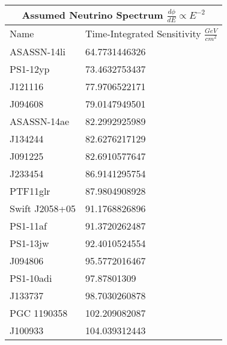 \documentclass[]{article}
\begin{document}
\begin{tabular}{ |p{5cm}||p{5cm}|} 
\hline 
\multicolumn{2}{|c|}{Assumed Neutrino Spectrum $ \frac {d \phi}{dE} \propto E ^ {-2} $} \\ 
\hline 
Name&Time-Integrated Sensitivity $ \frac{GeV}{cm^{2}}$ \\ 
\hline 
ASASSN-14li & \num[round-precision=2, round-mode=figures, scientific-notation=true]{64.7731446326}  \\ 
PS1-12yp & \num[round-precision=2, round-mode=figures, scientific-notation=true]{73.4632753437}  \\ 
J121116 & \num[round-precision=2, round-mode=figures, scientific-notation=true]{77.9706522171}  \\ 
J094608 & \num[round-precision=2, round-mode=figures, scientific-notation=true]{79.0147949501}  \\ 
ASASSN-14ae & \num[round-precision=2, round-mode=figures, scientific-notation=true]{82.2992925989}  \\ 
J134244 & \num[round-precision=2, round-mode=figures, scientific-notation=true]{82.6276217129}  \\ 
J091225 & \num[round-precision=2, round-mode=figures, scientific-notation=true]{82.6910577647}  \\ 
J233454 & \num[round-precision=2, round-mode=figures, scientific-notation=true]{86.9141295754}  \\ 
PTF11glr & \num[round-precision=2, round-mode=figures, scientific-notation=true]{87.9804908928}  \\ 
Swift J2058+05 & \num[round-precision=2, round-mode=figures, scientific-notation=true]{91.1768826896}  \\ 
PS1-11af & \num[round-precision=2, round-mode=figures, scientific-notation=true]{91.3720262487}  \\ 
PS1-13jw & \num[round-precision=2, round-mode=figures, scientific-notation=true]{92.4010524554}  \\ 
J094806 & \num[round-precision=2, round-mode=figures, scientific-notation=true]{95.5772016467}  \\ 
PS1-10adi & \num[round-precision=2, round-mode=figures, scientific-notation=true]{97.87801309}  \\ 
J133737 & \num[round-precision=2, round-mode=figures, scientific-notation=true]{98.7030260878}  \\ 
PGC 1190358 & \num[round-precision=2, round-mode=figures, scientific-notation=true]{102.209082087}  \\ 
J100933 & \num[round-precision=2, round-mode=figures, scientific-notation=true]{104.039312443}  \\ 

\end{tabular}
\end{document}
